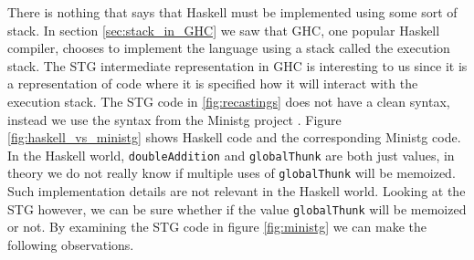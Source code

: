 There is nothing that says that Haskell must be implemented using some
sort of stack. In section \ref{sec:stack_in_GHC} we saw that GHC, one
popular Haskell compiler, chooses to implement the language using a
stack called the execution stack. The STG intermediate representation
in GHC is interesting to us since it is a representation of code where
it is specified how it will interact with the execution stack. The STG
code in \ref{fig:recastings} does not have a clean syntax, instead we
use the syntax from the Ministg project \cite{haskellwiki_ministg}.
Figure \ref{fig:haskell_vs_ministg} shows Haskell code and the
corresponding Ministg code. In the Haskell world, \texttt{doubleAddition} and
\texttt{globalThunk} are both just values, in theory we do not really
know if multiple uses of \texttt{globalThunk} will be memoized. Such
implementation details are not relevant in the Haskell world.
Looking at the STG however, we can be sure whether if the value
\texttt{globalThunk} will be memoized or not. By examining the STG code
in figure \ref{fig:ministg} we can make the following observations.

\begin{figure}
\end{figure}

